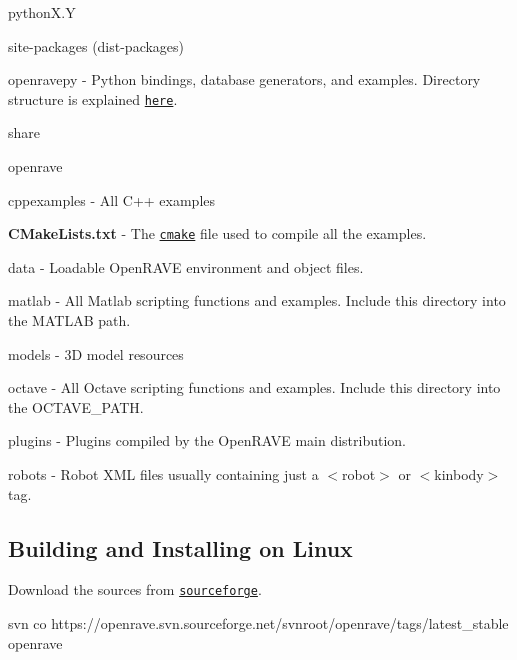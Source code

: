 \begin{DoxyItemize}
\begin{DoxyItemize}
\item pythonX.Y
\begin{DoxyItemize}
\item site-\/packages (dist-\/packages)
\begin{DoxyItemize}
\item openravepy -\/ Python bindings, database generators, and examples. Directory structure is explained \href{http://openrave.org/en/main/tutorials/openravepy_beginning.html#openravepy-beginning}{\tt here}.
\end{DoxyItemize}
\end{DoxyItemize}
\end{DoxyItemize}
\item share
\begin{DoxyItemize}
\item openrave
\begin{DoxyItemize}
\item cppexamples -\/ All C++ examples
\begin{DoxyItemize}
\item {\bfseries CMakeLists.txt} -\/ The \href{http://www.cmake.org/}{\tt cmake} file used to compile all the examples.
\end{DoxyItemize}
\item data -\/ Loadable OpenRAVE environment and object files.
\item matlab -\/ All Matlab scripting functions and examples. Include this directory into the MATLAB path.
\item models -\/ 3D model resources
\item octave -\/ All Octave scripting functions and examples. Include this directory into the OCTAVE\_\-PATH.
\item plugins -\/ Plugins compiled by the OpenRAVE main distribution.
\item robots -\/ Robot XML files usually containing just a {\ttfamily $<$robot$>$} or {\ttfamily $<$kinbody$>$} tag. 
\end{DoxyItemize}
\end{DoxyItemize}
\end{DoxyItemize}\hypertarget{installation_linux}{}\subsection{Building and Installing on Linux}\label{installation_linux}
Download the sources from \href{http://sourceforge.net/projects/openrave}{\tt sourceforge}.

\begin{DoxyVerb}
svn co https://openrave.svn.sourceforge.net/svnroot/openrave/tags/latest_stable openrave
\end{DoxyVerb}


